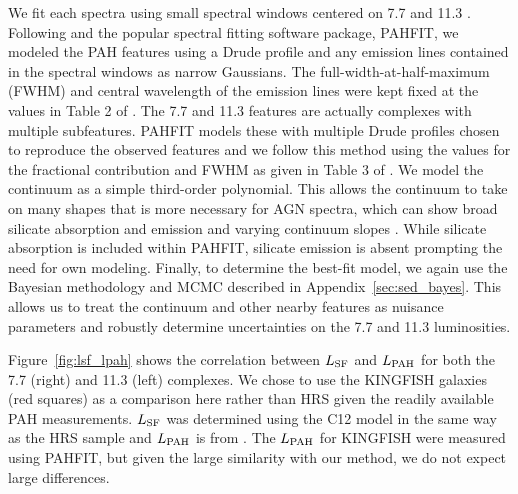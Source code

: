 \documentclass[fleqn, usenatbib]{mnras}
\begin{document}
We fit each spectra using small spectral windows centered on 7.7 and 11.3 \micron. Following \citet{Smith:2007lr} and the popular spectral fitting software package, PAHFIT, we modeled the PAH features using a Drude profile and any emission lines contained in the spectral windows as narrow Gaussians. The full-width-at-half-maximum (FWHM) and central wavelength of the emission lines were kept fixed at the values in Table 2 of \citet{Smith:2007lr}. The 7.7 and 11.3 \micron{} features are actually complexes with multiple subfeatures. PAHFIT models these with multiple Drude profiles chosen to reproduce the observed features and we follow this method using the values for the fractional contribution and FWHM as given in Table 3 of \citet{Smith:2007lr}. We model the continuum as a simple third-order polynomial. This allows the continuum to take on many shapes that is more necessary for AGN spectra, which can show broad silicate absorption and emission and varying continuum slopes \citep{Baum:2010kh, Spoon:2007oq, Wu:2009pt}. While silicate absorption is included within PAHFIT, silicate emission is absent prompting the need for own modeling. Finally, to determine the best-fit model, we again use the Bayesian methodology and MCMC described in Appendix~\ref{sec:sed_bayes}. This allows us to treat the continuum and other nearby features as nuisance parameters and robustly determine uncertainties on the 7.7 and 11.3 \micron{} luminosities.

Figure~\ref{fig:lsf_lpah} shows the correlation between $L_{\rm SF}$ and $L_{\rm PAH}$ for both the 7.7 (right) and 11.3 \micron{} (left) complexes. We chose to use the KINGFISH galaxies (red squares) as a comparison here rather than HRS given the readily available PAH measurements. $L_{\rm SF}$ was determined using the C12 model in the same way as the HRS sample and $L_{\rm PAH}$ is from \citet{Smith:2007lr}. The $L_{\rm PAH}$ for KINGFISH were measured using PAHFIT, but given the large similarity with our method, we do not expect large differences.
\end{document}
